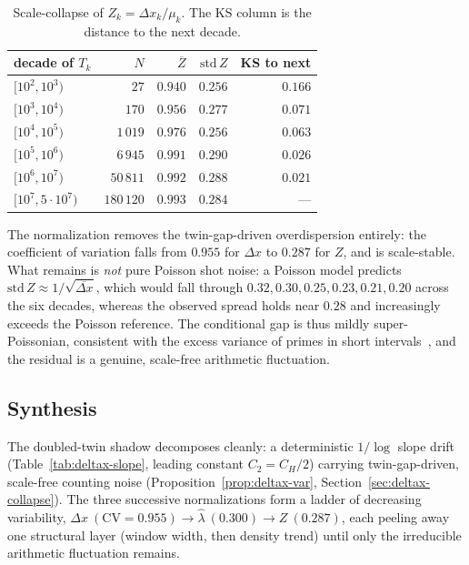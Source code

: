 \begin{table}[h]
\centering
\caption{Scale-collapse of $Z_k=\Delta x_k/\mu_k$. The KS column is the
distance to the next decade.}\label{tab:deltax-collapse}
\begin{tabular}{lrrrr}
\toprule
decade of $T_k$ & $N$ & $\overline{Z}$ & $\mathrm{std}\,Z$ & KS to next \\
\midrule
$[10^2,10^3)$        & $27$       & $0.940$ & $0.256$ & $0.166$ \\
$[10^3,10^4)$        & $170$      & $0.956$ & $0.277$ & $0.071$ \\
$[10^4,10^5)$        & $1\,019$   & $0.976$ & $0.256$ & $0.063$ \\
$[10^5,10^6)$        & $6\,945$   & $0.991$ & $0.290$ & $0.026$ \\
$[10^6,10^7)$        & $50\,811$  & $0.992$ & $0.288$ & $0.021$ \\
$[10^7,5\cdot10^7)$  & $180\,120$ & $0.993$ & $0.284$ & --- \\
\bottomrule
\end{tabular}
\end{table}

The normalization removes the twin-gap-driven overdispersion entirely: the
coefficient of variation falls from $0.955$ for $\Delta x$ to $0.287$ for $Z$,
and is scale-stable. What remains is \emph{not} pure Poisson shot noise: a
Poisson model predicts $\mathrm{std}\,Z\approx1/\sqrt{\overline{\Delta x}}$,
which would fall through $0.32,0.30,0.25,0.23,0.21,0.20$ across the six
decades, whereas the observed spread holds near $0.28$ and increasingly
exceeds the Poisson reference. The conditional gap is thus mildly
super-Poissonian, consistent with the excess variance of primes in short
intervals~\cite{MS2004}, and the residual is a genuine, scale-free arithmetic
fluctuation.

\subsection{Synthesis}\label{sec:deltax-synth}

The doubled-twin shadow decomposes cleanly: a deterministic $1/\log$ slope
drift (Table~\ref{tab:deltax-slope}, leading constant $C_2=C_H/2$) carrying
twin-gap-driven, scale-free counting noise
(Proposition~\ref{prop:deltax-var}, Section~\ref{sec:deltax-collapse}). The
three successive normalizations form a ladder of decreasing variability,
$\Delta x\ (\mathrm{CV}=0.955)\to\widehat\lambda\ (0.300)\to Z\ (0.287)$, each
peeling away one structural layer (window width, then density trend) until
only the irreducible arithmetic fluctuation remains.

